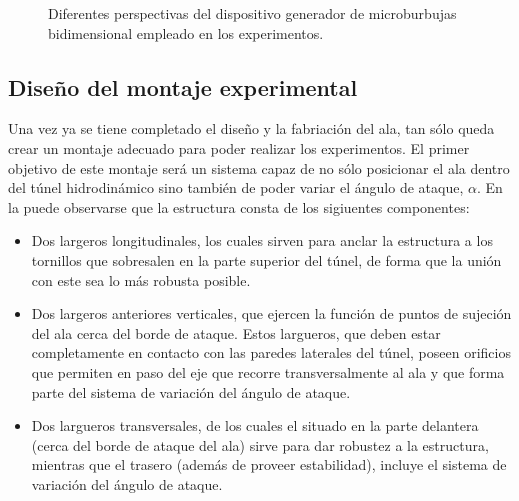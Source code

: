 \begin{figure}
\centering
{}
\hspace{1mm} 
\caption{Diferentes perspectivas del dispositivo generador de microburbujas bidimensional empleado en los experimentos.}
\end{figure}



\subsection{Diseño del montaje experimental}

Una vez ya se tiene completado el diseño y la fabriación del ala, tan sólo queda crear un montaje adecuado para poder realizar los experimentos. El primer objetivo de este montaje será un sistema capaz de no sólo posicionar el ala dentro del túnel hidrodinámico sino también de poder variar el ángulo de ataque, $\alpha$. En la  puede observarse que la estructura consta de los sigiuentes componentes:

\begin{itemize}
\item Dos largeros longitudinales, los cuales sirven para anclar la estructura a los tornillos que sobresalen en la parte superior del túnel, de forma que la unión con este sea lo más robusta posible. 
\item Dos largeros anteriores verticales, que ejercen  la función de puntos de sujeción del ala cerca del borde de ataque. Estos largueros, que deben estar completamente en contacto con las paredes laterales del túnel,  poseen orificios que permiten en paso del eje que recorre transversalmente al ala y que forma parte del sistema de variación del ángulo de ataque.
\item Dos largueros transversales, de los cuales el situado en la parte delantera (cerca del borde de ataque del ala) sirve para dar robustez a la estructura, mientras que el trasero (además de proveer estabilidad), incluye el sistema de variación del ángulo de ataque.
\end{itemize}


